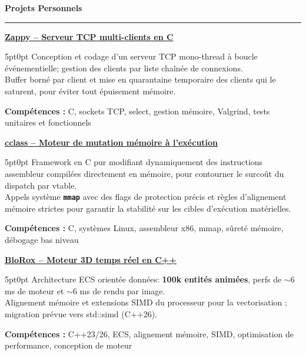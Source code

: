 \documentclass[9pt]{extarticle}
\begin{document}
\par\vspace{5pt}

{\large\bfseries Projets Personnels}
\par\vspace{-8pt}
\rule{\linewidth}{0.4pt}
\par\vspace{5pt}

\underline{\bfseries Zappy -- Serveur TCP multi-clients en C}
\par
\begin{adjustwidth}{5pt}{0pt}
    Conception et codage d'un serveur TCP mono-thread à boucle événementielle; gestion des clients par liste chaînée de connexions. \\
    Buffer borné par client et mise en quarantaine temporaire des clients qui le saturent, pour éviter tout épuisement mémoire.
\end{adjustwidth}
\par
{\bfseries Compétences :} C, sockets TCP, select, gestion mémoire, Valgrind, tests unitaires et fonctionnels

\par\vspace{8pt}

\underline{\bfseries \href{https://github.com/paulogarithm/cclass}{cclass} -- Moteur de mutation mémoire à l'exécution}
\par
\begin{adjustwidth}{5pt}{0pt}
    Framework en C pur modifiant dynamiquement des instructions assembleur compilées directement en mémoire, pour contourner le surcoût du dispatch par vtable. \\
    Appels système {\bfseries \texttt{mmap}} avec des flags de protection précis et règles d'alignement mémoire strictes pour garantir la stabilité sur les cibles d'exécution matérielles.
\end{adjustwidth}
\par
{\bfseries Compétences :} C, systèmes Linux, assembleur x86, mmap, sûreté mémoire, débogage bas niveau

\par\vspace{8pt}

\underline{\bfseries \href{https://github.com/paulogarithm/blorox}{BloRox} -- Moteur 3D temps réel en C++}
\par
\begin{adjustwidth}{5pt}{0pt}
	Architecture ECS orientée données: {\bfseries 100k entités animées}, perfs de $\sim$6 ms de moteur et $\sim$6 ms de rendu par image. \\
	Alignement mémoire et extensions SIMD du processeur pour la vectorisation ; migration prévue vers {\ttfamily std::simd} (C++26).
\end{adjustwidth}
\par
{\bfseries Compétences :} C++23/26, ECS, alignement mémoire, SIMD, optimisation de performance, conception de moteur
\end{document}
